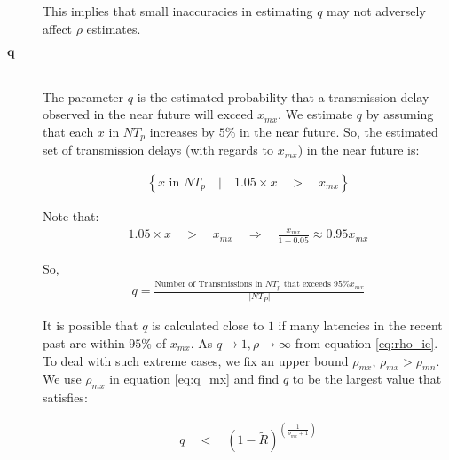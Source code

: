 \begin{description}
        This implies that small inaccuracies in estimating $q$ may not adversely affect $\rho$ estimates.  

        \item[\Huge$\boldsymbol{q}$] \hfill \\
                The parameter $q$ is the estimated probability that a transmission delay observed in the near future will exceed $x_{mx}$.  We estimate $q$ by assuming that each $x$ in $NT_p$ increases by $5\%$ in the near future.  So, the estimated set of transmission delays (with regards to $x_{mx}$) in the near future is:
                
        \begin{equation}
            \begin{aligned}
                \left\{ x \text{ in } NT_p \quad  | \quad 1.05 \times x \quad > \quad x_{mx} \right\}
            \end{aligned}
        \end{equation}
                
        Note that:
         \begin{equation}
            \begin{aligned}
                1.05 \times x \quad > \quad x_{mx} \quad \Rightarrow \quad \frac{x_{mx}}{1 + 0.05 } \approx 0.95 x_{mx}
            \end{aligned}
        \end{equation}
                
        So,
            \begin{equation}
            \begin{aligned}
                q  = \frac{\text{Number of Transmissions in } NT_p \text{ that exceeds } 95\% x_{mx}}{|NT_P|}
            \end{aligned}
        \end{equation}
        
                It is possible that $q$ is calculated close to $1$ if many latencies in the recent past are within $95\%$ of $x_{mx}$.  As $q \rightarrow 1, \rho \rightarrow \infty$ from equation \ref{eq:rho_ie}.  To deal with such extreme cases, we fix an upper bound $\rho_{mx}$, $\rho_{mx} > \rho_{mn}$.  We use $\rho_{mx}$ in equation \ref{eq:q_mx} and find $q$ to be the largest value that satisfies:
                
       \begin{equation}
            \begin{aligned}
                q \quad < \quad \left(1 - \tilde{R}\right)^{\left(\frac{1}{\rho_{mx} + 1} \right)}
            \end{aligned}
        \end{equation}


\end{description}
